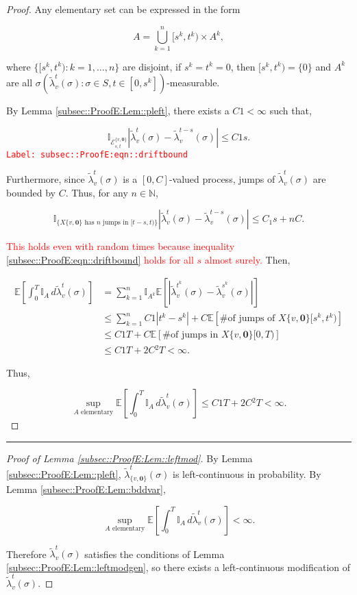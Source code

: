 \documentclass[12pt]{article}
\newcommand{\mb}{\mathbb}
\newcommand{\mc}{\mathcal}
\newcommand{\te}{\text}
\newcommand{\tr}{\textcolor{red}}
\newcommand{\labe}[1]{\tr{\texttt{Label: #1}}}
\newcommand{\lin}{\rule{\linewidth}{0.4 pt}}
\newcommand{\ex}[1]{\mb{E}\left[#1\right]}			%
\renewcommand{\root}{\mathbf{0}}				%
\renewcommand{\v}{v}							%
\renewcommand{\S}{S}							%
\newcommand{\s}{\sigma}							%
\newcommand{\T}{T}								%
\renewcommand{\t}{t}							%
\renewcommand{\tt}{s}							%
\newcommand{\X}{X}								%
\newcommand{\const}{C}							%
\newcommand{\sln}[1]{^{#1}}						%
\renewcommand{\it}{k}								%
\newcommand{\crate}[2]{\alt{\lambda}_{#1}^{#2}}		%
\newcommand{\alt}{\widetilde}						%
\newcommand{\evnt}{\mc{E}}						%
\newcommand{\typset}{A}							%
\begin{document}
\begin{proof}
Any elementary set can be expressed in the form

\[\typset = \bigcup_{\it = 1}^n [\tt^\it,\t^\it)\times \typset\sln{\it},\]

where \(\{[\tt^\it,\t^\it):\it=1,\dots,n\}\) are disjoint, if \(\tt^\it = \t^\it = 0\), then \([\tt^\it,\t^\it) = \{0\}\) and \(\typset\sln{\it}\) are all \(\sigma(\crate{\v}{\t}(\s):\s \in \S,\t\in [0,\tt^\it])\)-measurable. 

By Lemma \ref{subsec::ProofE:Lem::pleft}, there exists a \(\const{1} < \infty\) such that,

\begin{equation}
\mb{I}_{\evnt^{\{\v,\root\}}_{\tt,\t}}|\crate{\v}{\t}(\s) - \crate{\v}{\t-\tt}(\s)| \leq \const{1}\tt.
\label{subsec::ProofE:eqn::driftbound}
\end{equation}
\labe{subsec::ProofE:eqn::driftbound}

Furthermore, since \(\crate{\v}{\t}(\s)\) is a \([0,\const{}]\)-valued process, jumps of \(\crate{\v}{\t}(\s)\) are bounded by \(\const{}\). Thus, for any \(n \in \mb{N}\),

\[\mb{I}_{\{\X{\{\v,\root\}}{}\te{ has }n\te{ jumps in } [\t-\tt,\t)\}}|\crate{\v}{\t}(\s) - \crate{\v}{\t-\tt}(\s)|\leq C_1\tt + n \const{}.\]

\tr{This holds even with random times because inequality \eqref{subsec::ProofE:eqn::driftbound} holds for all \(\tt\) almost surely.} Then,

\begin{align*}
\ex{\int_0^\T \mb{I}_\typset\,d\crate{\v}{\t}(\s)} &= \sum_{\it = 1}^n \mb{I}_{\typset^\it}\ex{\left|\crate{\v}{\t^k}(\s) - \crate{\v}{\tt^k}(\s)\right|}\\
&\leq \sum_{\it=1}^n \const{1}|\t^\it - \tt^\it| + \const{}\ex{\te{\# of jumps of }\X{\{\v,\root\}}{[\tt^\it,\t^\it)}}\\
&\leq \const{1}\T + \const{}\ex{\te{\# of jumps in }\X{\{\v,\root\}}{[0,\T)}}\\
&\leq \const{1}\T + 2\const{}^2\T < \infty.
\end{align*}

Thus,

\[\sup_{\typset\te{ elementary}} \ex{\int_0^\T \mb{I}_\typset\,d\crate{\v}{\t}(\s)} \leq \const{1}\T + 2\const{}^2\T < \infty.\]
\end{proof}

\lin

\begin{proof}[Proof of Lemma \ref{subsec::ProofE:Lem::leftmod}]

By Lemma \ref{subsec::ProofE:Lem::pleft}, \(\crate{\{\v,\root\}}{\t}(\s)\) is left-continuous in probability. By Lemma \ref{subsec::ProofE:Lem::bddvar},

\[\sup_{\typset\te{ elementary}} \ex{\int_0^\T \mb{I}_{\typset}\,d\crate{\v}{\t}(\s)} < \infty.\]

Therefore \(\crate{\v}{\t}(\s)\) satisfies the conditions of Lemma \ref{subsec::ProofE:Lem::leftmodgen}, so there exists a left-continuous modification of \(\crate{\v}{\t}(\s)\).
\end{proof}
\end{document}
